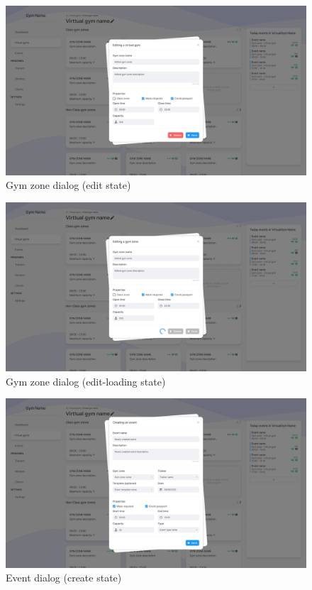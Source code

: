 \documentclass[a4paper, 12pt, oneside]{book}
\begin{document}
\begin{figure}[h!]
	\centering
	\includegraphics[width=\textwidth]{assets/ui/EditGymZone.png}
	\caption{Gym zone dialog (edit state)}
\end{figure}
\begin{figure}[h!]
	\centering
	\includegraphics[width=\textwidth]{assets/ui/EditLoadingGymZone.png}
	\caption{Gym zone dialog (edit-loading state)}
\end{figure}
\begin{figure}[h!]
	\centering
	\includegraphics[width=\textwidth]{assets/ui/CreateEvent.png}
	\caption{Event dialog (create state)}
\end{figure}
\end{document}
